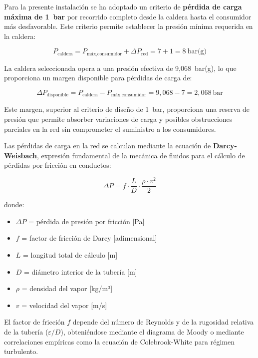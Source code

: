 Para la presente instalación se ha adoptado un criterio de \textbf{pérdida de carga máxima de 1~bar} por recorrido completo desde la caldera hasta el consumidor más desfavorable. Este criterio permite establecer la presión mínima requerida en la caldera:

\begin{equation}
	P_{\text{caldera}} = P_{\text{máx,consumidor}} + \Delta P_{\text{red}} = 7 + 1 = 8 \ \text{bar(g)}
	\label{eq:presion-minima-caldera}
\end{equation}

La caldera seleccionada opera a una presión efectiva de 9,068~bar(g), lo que proporciona un margen disponible para pérdidas de carga de:

\begin{equation}
	\Delta P_{\text{disponible}} = P_{\text{caldera}} - P_{\text{máx,consumidor}} = 9{,}068 - 7 = 2{,}068 \ \text{bar}
	\label{eq:margen-presion-disponible}
\end{equation}

Este margen, superior al criterio de diseño de 1~bar, proporciona una reserva de presión que permite absorber variaciones de carga y posibles obstrucciones parciales en la red sin comprometer el suministro a los consumidores.

Las pérdidas de carga en la red se calculan mediante la ecuación de \textbf{Darcy-Weisbach}, expresión fundamental de la mecánica de fluidos para el cálculo de pérdidas por fricción en conductos:

\begin{equation}
	\Delta P = f \cdot \frac{L}{D} \cdot \frac{\rho \cdot v^2}{2}
	\label{eq:darcy-weisbach}
\end{equation}

\noindent donde:
\begin{itemize}[leftmargin=2em, label={}]
	\item $\Delta P$ = pérdida de presión por fricción [Pa]
	\item $f$ = factor de fricción de Darcy [adimensional]
	\item $L$ = longitud total de cálculo [m]
	\item $D$ = diámetro interior de la tubería [m]
	\item $\rho$ = densidad del vapor [kg/m³]
	\item $v$ = velocidad del vapor [m/s]
\end{itemize}

El factor de fricción $f$ depende del número de Reynolds y de la rugosidad relativa de la tubería ($\varepsilon/D$), obteniéndose mediante el diagrama de Moody o mediante correlaciones empíricas como la ecuación de Colebrook-White para régimen turbulento.


